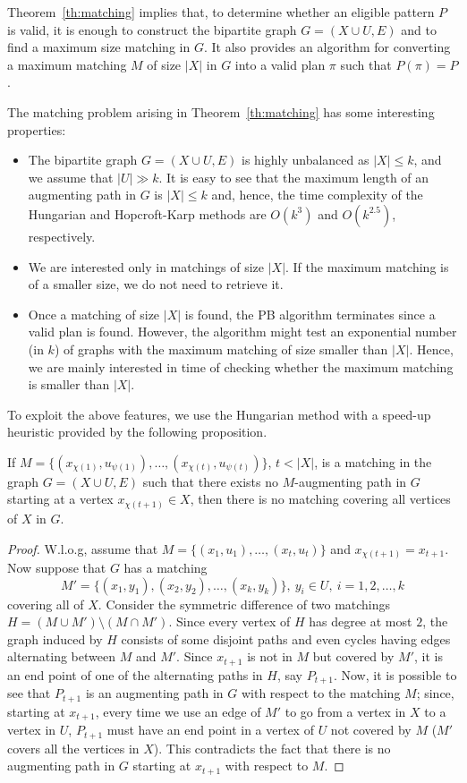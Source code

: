 \documentclass[runningheads,proof]{llncs}
\begin{document}
Theorem~\ref{th:matching} implies that, to determine whether an eligible pattern $P$ is valid, it is enough to construct the bipartite graph $G = (X \cup U, E)$ and to find a maximum size matching in $G$.  
It also provides an algorithm for converting a maximum matching $M$ of size $|X|$ in $G$ into a valid plan $\pi$ such that $P(\pi) = P$.

The matching problem arising in Theorem~\ref{th:matching} has some interesting properties:
\begin{itemize}
	\item The bipartite graph $G = (X \cup U, E)$ is highly unbalanced as $|X| \le k$, and we assume that $|U| \gg k$.  
	It is easy to see that the maximum length of an augmenting path in $G$ is $|X| \le k$ and, hence, the time complexity of the Hungarian and Hopcroft-Karp methods are $O(k^3)$ and $O(k^{2.5})$, respectively.
	\item We are interested only in matchings of size $|X|$.  If the maximum matching is of a smaller size, we do not need to retrieve it.
	\item Once a matching of size $|X|$ is found, the PB algorithm terminates since a valid plan is found.  
	However, the algorithm might test an exponential number (in $k$) of graphs with the maximum matching of size smaller than $|X|$.
	Hence, we are mainly interested in time of checking whether the maximum matching is smaller than $|X|$.
\end{itemize}

To exploit the above features, we use the Hungarian method with a speed-up heuristic provided by the following proposition.
\begin{proposition}
\label{lemma:matching}
If $M = \{ (x_{\chi(1)}, u_{\psi(1)}), \ldots, (x_{\chi(t)}, u_{\psi(t)}) \}$, $t < |X|$, is a matching in the graph $G = (X \cup U, E)$ such that there exists no $M$-augmenting path in $G$ starting at a vertex $x_{\chi(t+1)} \in X$, then there is no matching covering all vertices of $X$ in $G$.
\end{proposition}
\begin{proof}
W.l.o.g, assume that $M=\{(x_1,u_1),\dots ,(x_t,u_t)\}$ and $x_{\chi(t+1)}=x_{t+1}$. Now suppose that $G$ has a matching $$M' = \{ (x_1, y_1), (x_2, y_2),\ldots, (x_k, y_k) \},\ y_i \in U,\ i = 1, 2, \ldots, k$$ covering all of $X$.
Consider the symmetric difference of two matchings $H = (M \cup M') \setminus (M \cap M')$. 
Since every vertex of $H$ has degree at most $2$, the graph induced by $H$ consists of some disjoint paths and even cycles having edges alternating between $M$ and $M'$. 
Since $x_{t+1}$ is not in $M$ but covered by $M'$, it is an end point of one of the alternating paths in $H$, say $P_{t+1}$. 
Now, it is possible to see that $P_{t+1}$ is an augmenting path in $G$ with respect to the matching $M$; since, starting at $x_{t+1}$, every time we use an edge of $M'$ to go from a vertex in $X$ to a vertex in $U$, $P_{t+1}$ must have an end point in a vertex of $U$ not covered by $M$ ($M'$ covers all the vertices in $X$). 
This contradicts the fact that there is no augmenting path in $G$ starting at $x_{t+1}$ with respect to $M$.\squareforqed
\end{proof}
\end{document}
